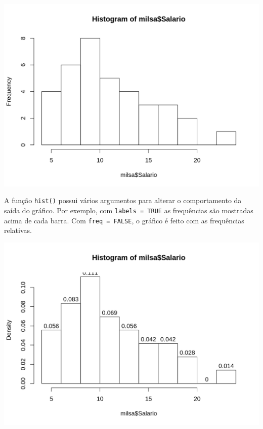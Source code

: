 \documentclass[10pt,a4paper]{book}
\newenvironment{Shaded}{\begin{snugshade}}{\end{snugshade}}
\newcommand{\KeywordTok}[1]{\textcolor[rgb]{0.13,0.29,0.53}{\textbf{#1}}}
\newcommand{\DataTypeTok}[1]{\textcolor[rgb]{0.13,0.29,0.53}{#1}}
\newcommand{\OtherTok}[1]{\textcolor[rgb]{0.56,0.35,0.01}{#1}}
\newcommand{\OperatorTok}[1]{\textcolor[rgb]{0.81,0.36,0.00}{\textbf{#1}}}
\newcommand{\NormalTok}[1]{#1}
\begin{document}
\begin{center}\includegraphics{figures/unnamed-chunk-307-1} \end{center}

A função \texttt{hist()} possui vários argumentos para alterar o
comportamento da saída do gráfico. Por exemplo, com
\texttt{labels\ =\ TRUE} as frequências são mostradas acima de cada
barra. Com \texttt{freq\ =\ FALSE}, o gráfico é feito com as frequências
relativas.

\begin{Shaded}
\end{Shaded}

\begin{center}\includegraphics{figures/unnamed-chunk-308-1} \end{center}
\end{document}
